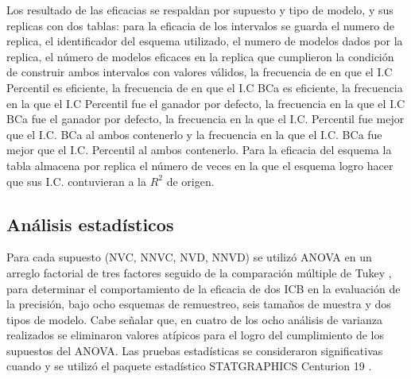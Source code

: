 Los resultado de las eficacias se respaldan por supuesto y tipo de modelo, y sus replicas con dos tablas: para la eficacia de los intervalos se guarda el numero de replica, el identificador del esquema utilizado, el numero de modelos dados por la replica, el número de modelos eficaces en la replica que cumplieron la condición de construir ambos intervalos con valores válidos, la frecuencia de en que el I.C Percentil es eficiente, la frecuencia de en que el I.C BCa es eficiente, la frecuencia en la que el I.C Percentil fue el ganador por defecto, la frecuencia en la que el I.C BCa fue el ganador por defecto, la frecuencia en la que el I.C. Percentil fue mejor que el I.C. BCa al ambos contenerlo y la frecuencia en la que el I.C. BCa fue mejor que el I.C. Percentil al ambos contenerlo. Para la eficacia del esquema la tabla almacena por replica el número de veces en la que el esquema logro hacer que sus I.C. contuvieran a la \( R^2 \) de origen. \\



\subsection{Análisis estadísticos}
Para cada supuesto (NVC, NNVC, NVD, NNVD) se utilizó ANOVA en un arreglo factorial de tres factores seguido de la comparación múltiple de Tukey \parencite{montgomery-2017}, para determinar el comportamiento de la eficacia de dos ICB en la evaluación de la precisión, bajo ocho esquemas de remuestreo, seis tamaños de muestra y dos tipos de modelo. Cabe señalar que, en cuatro de los ocho análisis de varianza realizados se eliminaron valores atípicos para el logro del cumplimiento de los supuestos del ANOVA.
Las pruebas estadísticas se consideraron significativas cuando  y se utilizó el paquete estadístico STATGRAPHICS Centurion 19 \parencite{statgraphics-2024} .




